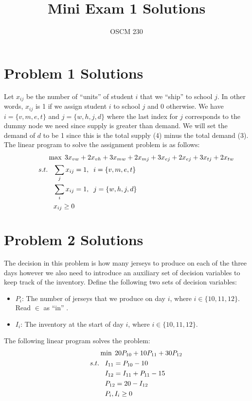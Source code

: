 \documentclass{article}[11 pt]    %
\begin{document}


\title{Mini Exam 1 Solutions}

\author{OSCM 230}

\maketitle


\section*{Problem 1 Solutions}

Let $x_{ij}$ be the number of ``units'' of student $i$ that we ``ship'' to school $j$.  In other words, $x_{ij}$ is 1 if we assign student $i$ to school $j$ and 0 otherwise.  We have $i=\{v, m, e, t\}$ and $j=\{w, h, j, d\}$ where the last index for $j$ corresponds to the dummy node we need since supply is greater than demand.  We will set the demand of $d$ to be 1 since this is the total supply (4) minus the total demand (3).  The linear program to solve the assignment problem is as follows:
\begin{align*}
\hspace{1.5cm}& \max \;3x_{vw} + 2x_{vh} +  3x_{mw} + 2x_{mj} +  3x_{ej} + 2x_{ej} +  3x_{tj} + 2x_{tw} \\
s.t. &\;\;\; \sum_{j} x_{ij}=1,\;\;i=\{v, m, e, t\}  \\
&\;\;\; \sum_{i} x_{ij}=1,\;\;j=\{w, h, j, d\} \\
&\;\;\; x_{ij} \geq 0
\end{align*} 


\section*{Problem 2 Solutions}

The decision in this problem is how many jerseys to produce on each of the three days however we also need to introduce an auxiliary set of decision variables to keep track of the inventory.  Define the following two sets of decision variables:
\begin{itemize}
\item $P_i$: The number of jerseys that we produce on day $i$, where $i \in \{10, 11, 12\}$.  Read $\in$ as ``in'' .
\item $I_i$: The inventory at the start of day $i$,  where $i \in \{10, 11, 12\}$.
\end{itemize}
The following linear program solves the problem:
\begin{align*}
\hspace{1.5cm}& \min \;20P_{10} + 10P_{11} + 30P_{12} \\
s.t. &\;\;\; I_{11}= P_{10} -10  \\
&\;\;\; I_{12}=I_{11} + P_{11} - 15 \\
&\;\;\; P_{12}=20- I_{12}  \\
&\;\;\; P_i, I_i \geq 0
\end{align*} 
\end{document}
